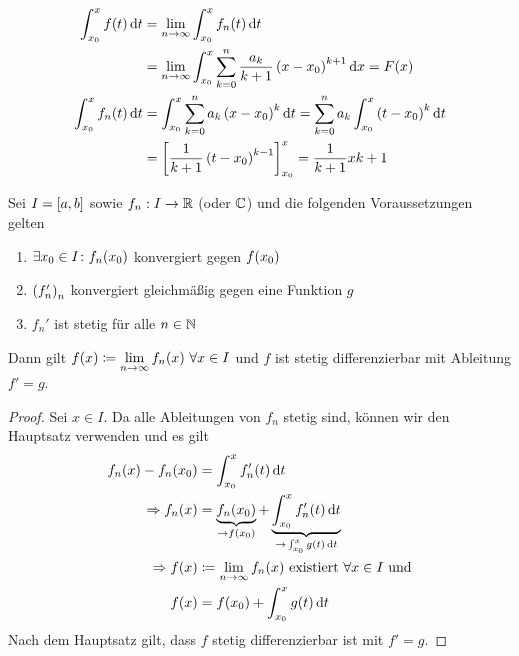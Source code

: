 \begin{beispiel}
\begin{align*}
        \int_{x_0}^{x} f\of{t} \dif t &= \lim_{\ntoinf} \int_{x_0}^{x} f_n\of{t} \dif t\\
        &= \lim_{\ntoinf} \int_{x_0}^{x} \sum_{k=0}^{n} \frac{a_k}{k+1}\pair{x-x_0}^{k+1} \dif x = F(x)\\
        \int_{x_0}^{x} f_n\of{t} \dif t &= \int_{x_0}^{x} \sum_{k=0}^{n} a_k\pair{x-x_0}^k \dif t = \sum_{k=0}^{n} a_k \int_{x_0}^{x} \pair{t-x_0}^k \dif t\\
        &= \interv{\frac{1}{k+1}\pair{t-x_0}^{k-1}}_{x_0}^{x} = \frac{1}{k+1}x{k+1}
    \end{align*}
\end{beispiel}

\begin{satz}
    Sei $I=\left[a,b\right]$ sowie $f_n: I\rightarrow{}\mathbb{R}$ (oder $\mathbb{C}$) und die folgenden Voraussetzungen gelten
    \begin{enumerate}[label=(\roman*)]
        \item $\exists x_0\in I\colon f_n\of{x_0}$ konvergiert gegen $f\of{x_0}$
        \item $\left(f_n'\right)_n$ konvergiert gleichmäßig gegen eine Funktion $g$
        \item $f_n'$ ist stetig für alle $n\in\mathbb{N}$
    \end{enumerate}
    Dann gilt $f(x) \coloneqq \displaystyle\lim_{\ntoinf} f_n\of{x}~\forall x\in I$ und $f$ ist stetig differenzierbar mit Ableitung $f' = g$.
    \begin{proof}
        Sei $x\in I$. Da alle Ableitungen von $f_n$ stetig sind, können wir den Hauptsatz verwenden und es gilt
        \begin{align*}
            f_n\of{x} - f_n\of{x_0} &= \int_{x_0}^{x} f_n'\of{t} \dif t\\
            \impl f_n\of{x} &= \underbrace{f_n\of{x_0}}_{\fromto f\of{x_0}} + \underbrace{\int_{x_0}^{x} f_n'\of{t} \dif t}_{\fromto \int_{x_0}^{x} g\of{t} \dif t}\\
            \impl f\of{x} &\coloneqq \lim_{\ntoinf} f_n\of{x} \text{ existiert } \forall x\in I \text{ und}\\
            f\of{x} &= f\of{x_0} + \int_{x_0}^{x} g\of{t} \dif t
        \end{align*}
        Nach dem Hauptsatz gilt, dass $f$ stetig differenzierbar ist mit $f' = g$.
    \end{proof}
\end{satz}

